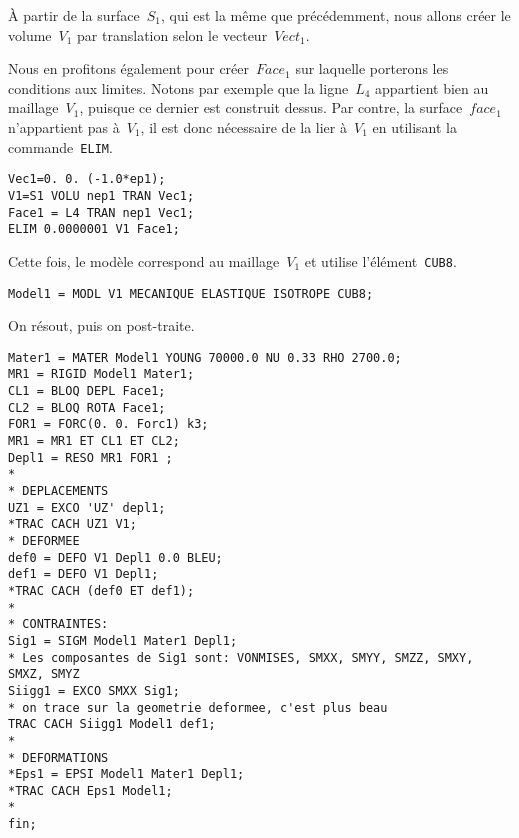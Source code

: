 À partir de la surface~$S_1$, qui est la même que précédemment, nous allons créer le volume~$V_1$ par translation selon le vecteur~$Vect_1$.

Nous en profitons également pour créer~$Face_1$ sur laquelle porterons les conditions aux limites. Notons par exemple que la ligne~$L_4$ appartient bien au maillage~$V_1$, puisque ce dernier est construit dessus. Par contre, la surface~$face_1$ n'appartient pas à~$V_1$, il est donc nécessaire de la lier à~$V_1$ en utilisant la commande~\lstinline!ELIM!.
\begin{lstlisting}[firstnumber=last]
Vec1=0. 0. (-1.0*ep1);
V1=S1 VOLU nep1 TRAN Vec1;
Face1 = L4 TRAN nep1 Vec1;
ELIM 0.0000001 V1 Face1;
\end{lstlisting}

Cette fois, le modèle correspond au maillage~$V_1$ et utilise l'élément~\lstinline!CUB8!.
\begin{lstlisting}[firstnumber=last]
Model1 = MODL V1 MECANIQUE ELASTIQUE ISOTROPE CUB8;
\end{lstlisting}

On résout, puis on post-traite.
\begin{lstlisting}[firstnumber=last]
Mater1 = MATER Model1 YOUNG 70000.0 NU 0.33 RHO 2700.0;
MR1 = RIGID Model1 Mater1;
CL1 = BLOQ DEPL Face1;
CL2 = BLOQ ROTA Face1;
FOR1 = FORC(0. 0. Forc1) k3;
MR1 = MR1 ET CL1 ET CL2;
Depl1 = RESO MR1 FOR1 ;
*
* DEPLACEMENTS
UZ1 = EXCO 'UZ' depl1;
*TRAC CACH UZ1 V1;
* DEFORMEE
def0 = DEFO V1 Depl1 0.0 BLEU;
def1 = DEFO V1 Depl1;
*TRAC CACH (def0 ET def1);
*
* CONTRAINTES: 
Sig1 = SIGM Model1 Mater1 Depl1;
* Les composantes de Sig1 sont: VONMISES, SMXX, SMYY, SMZZ, SMXY, SMXZ, SMYZ
Siigg1 = EXCO SMXX Sig1;
* on trace sur la geometrie deformee, c'est plus beau
TRAC CACH Siigg1 Model1 def1;
*
* DEFORMATIONS
*Eps1 = EPSI Model1 Mater1 Depl1;
*TRAC CACH Eps1 Model1;
*
fin;
\end{lstlisting}
